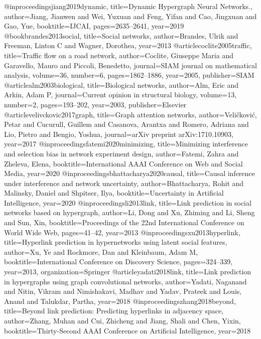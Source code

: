@inproceedings{jiang2019dynamic,
  title={Dynamic Hypergraph Neural Networks.},
  author={Jiang, Jianwen and Wei, Yuxuan and Feng, Yifan and Cao, Jingxuan and Gao, Yue},
  booktitle={IJCAI},
  pages={2635--2641},
  year={2019}
}
@book{brandes2013social,
  title={Social networks},
  author={Brandes, Ulrik and Freeman, Linton C and Wagner, Dorothea},
  year={2013}
}
@article{coclite2005traffic,
  title={Traffic flow on a road network},
  author={Coclite, Giuseppe Maria and Garavello, Mauro and Piccoli, Benedetto},
  journal={SIAM journal on mathematical analysis},
  volume={36},
  number={6},
  pages={1862--1886},
  year={2005},
  publisher={SIAM}
}
@article{alm2003biological,
  title={Biological networks},
  author={Alm, Eric and Arkin, Adam P},
  journal={Current opinion in structural biology},
  volume={13},
  number={2},
  pages={193--202},
  year={2003},
  publisher={Elsevier}
}
@article{velivckovic2017graph,
  title={Graph attention networks},
  author={Veli{\v{c}}kovi{\'c}, Petar and Cucurull, Guillem and Casanova, Arantxa and Romero, Adriana and Lio, Pietro and Bengio, Yoshua},
  journal={arXiv preprint arXiv:1710.10903},
  year={2017}
}
@inproceedings{fatemi2020minimizing,
  title={Minimizing interference and selection bias in network experiment design},
  author={Fatemi, Zahra and Zheleva, Elena},
  booktitle={International AAAI Conference on Web and Social Media},
  year={2020}
}
@inproceedings{bhattacharya2020causal,
  title={Causal inference under interference and network uncertainty},
  author={Bhattacharya, Rohit and Malinsky, Daniel and Shpitser, Ilya},
  booktitle={Uncertainty in Artificial Intelligence},
  year={2020}
}
@inproceedings{li2013link,
  title={Link prediction in social networks based on hypergraph},
  author={Li, Dong and Xu, Zhiming and Li, Sheng and Sun, Xin},
  booktitle={Proceedings of the 22nd International Conference on World Wide Web},
  pages={41--42},
  year={2013}
}
@inproceedings{xu2013hyperlink,
  title={Hyperlink prediction in hypernetworks using latent social features},
  author={Xu, Ye and Rockmore, Dan and Kleinbaum, Adam M},
  booktitle={International Conference on Discovery Science},
  pages={324--339},
  year={2013},
  organization={Springer}
}
@article{yadati2018link,
  title={Link prediction in hypergraphs using graph convolutional networks},
  author={Yadati, Naganand and Nitin, Vikram and Nimishakavi, Madhav and Yadav, Prateek and Louis, Anand and Talukdar, Partha},
  year={2018}
}
@inproceedings{zhang2018beyond,
  title={Beyond link prediction: Predicting hyperlinks in adjacency space},
  author={Zhang, Muhan and Cui, Zhicheng and Jiang, Shali and Chen, Yixin},
  booktitle={Thirty-Second AAAI Conference on Artificial Intelligence},
  year={2018}
}
